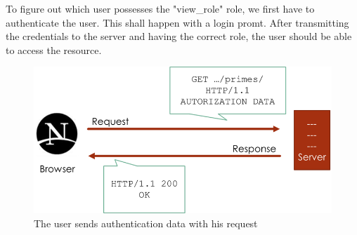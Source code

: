 \documentclass[12pt,a4paper]{report}
\begin{document}
\noindent
To figure out which user possesses the "view\_role" role, we first have to authenticate the user. This shall happen with a login promt. After transmitting the credentials to the server and having the correct role, the user should be able to access the resource.
\begin{figure}[h!]
	\centering
	\includegraphics[width=1\linewidth]{res/Authorized}
	\caption{The user sends authentication data with his request}
	\label{fig:Authorized}
\end{figure}
\end{document}
